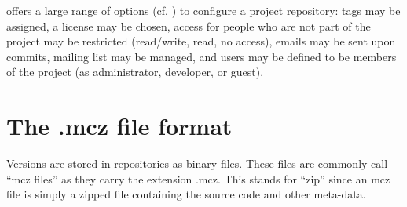 \documentclass[a4paper,10pt,twoside]{book}
\begin{document}
\MC offers a large range of options (cf. ) to configure a project repository: tags may be assigned, a license may be chosen, access for people who are not part of the project may be restricted (read/write, read, no access), emails may be sent upon commits, mailing list may be managed, and users may be defined to be members of the project (as administrator, developer, or guest).





\section{The .mcz file format}

Versions are stored in repositories as binary files.
These files are commonly call ``mcz files'' as they carry the extension .mcz.
This stands for ``\MC zip'' since an mcz file is simply a zipped file containing the source code and other meta-data.
\end{document}
